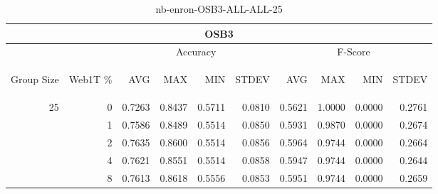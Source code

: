 \begin{center}
\begin{table}[htbp] 
 \begin{center}
\begin{tabular}{ | r | r | r | r | r | r | r | r | r | r |}
\hline
\multicolumn{10}{|c|}{OSB3}\\
\hline
 & & \multicolumn{4}{|c|}{Accuracy} & \multicolumn{4}{|c|}{F-Score}\\ \cline{3-10}
\begin{sideways}Group Size\end{sideways} & \begin{sideways}Web1T \%\end{sideways} & \begin{sideways}AVG\end{sideways} & \begin{sideways}MAX\end{sideways} & \begin{sideways}MIN\end{sideways} & \begin{sideways}STDEV\end{sideways} & \begin{sideways}AVG\end{sideways} & \begin{sideways}MAX\end{sideways} & \begin{sideways}MIN\end{sideways} & \begin{sideways}STDEV\end{sideways}\\
\hline
\multirow{4}{*}{25}
 & 0 & 0.7263 & 0.8437 & 0.5711 & 0.0810 & 0.5621 & 1.0000 & 0.0000 & 0.2761\\ \cline{2-10}
 & 1 & 0.7586 & 0.8489 & 0.5514 & 0.0850 & 0.5931 & 0.9870 & 0.0000 & 0.2674\\ \cline{2-10}
 & 2 & 0.7635 & 0.8600 & 0.5514 & 0.0856 & 0.5964 & 0.9744 & 0.0000 & 0.2664\\ \cline{2-10}
 & 4 & 0.7621 & 0.8551 & 0.5514 & 0.0858 & 0.5947 & 0.9744 & 0.0000 & 0.2644\\ \cline{2-10}
 & 8 & 0.7613 & 0.8618 & 0.5556 & 0.0853 & 0.5951 & 0.9744 & 0.0000 & 0.2659\\ \cline{2-10}
\hline
\end{tabular}
\caption{nb-enron-OSB3-ALL-ALL-25}
\label{table:nb-enron-OSB3-ALL-ALL-25}
\end{center}
 \end{table}
\end{center}

